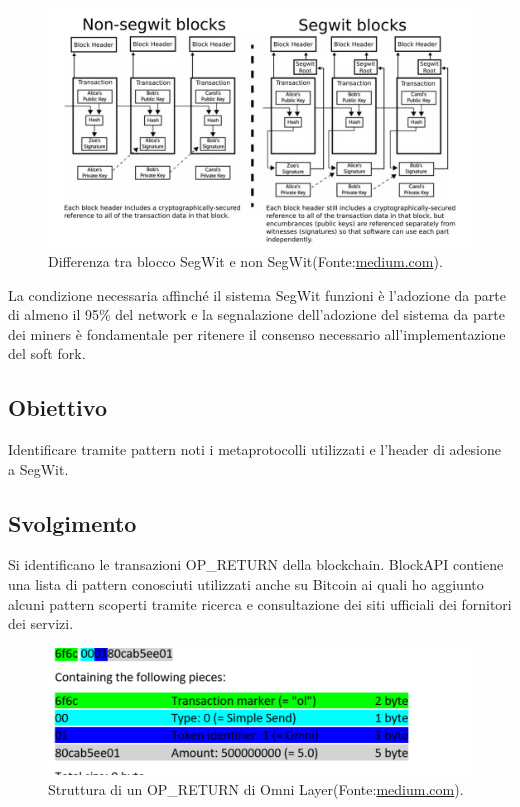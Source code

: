 \begin{figure}[h]
	\centering
	\includegraphics[width=1.0\linewidth]{images/segwitvsnonsegwit-medium}
	\caption{Differenza tra blocco SegWit e non SegWit(Fonte:\url{medium.com}).}
	\label{fig:segwitvsnonsegwit-medium}
\end{figure}


La condizione necessaria affinché il sistema SegWit funzioni è l’adozione da parte di almeno il 95\% del network e la segnalazione dell’adozione del sistema da parte dei miners è fondamentale per ritenere il consenso necessario all’implementazione del soft fork.


\subsection{Obiettivo}
Identificare tramite pattern noti i metaprotocolli utilizzati e l’header di adesione a SegWit.
\subsection{Svolgimento}
Si identificano le transazioni OP\_RETURN della blockchain. BlockAPI contiene una lista di pattern conosciuti utilizzati anche su Bitcoin ai quali ho aggiunto alcuni pattern scoperti tramite ricerca e consultazione dei siti ufficiali dei fornitori dei servizi.

\begin{figure}[h]
	\centering
	\includegraphics[width=1.0\linewidth]{images/ol-omnilayer-medium}
	\caption{Struttura di un OP\_RETURN di Omni Layer(Fonte:\url{medium.com}).}
	\label{fig:ol-omnilayer-medium}
\end{figure}

